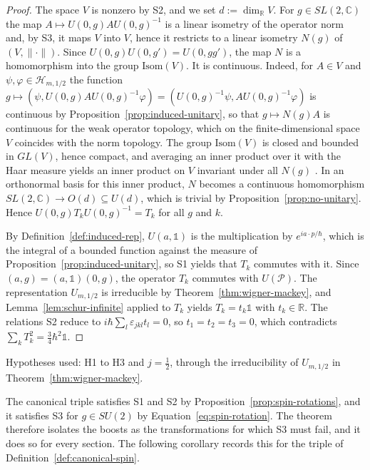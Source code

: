 \begin{proof}
	The space $V$ is nonzero by S2, and we set $d:=\dim_{\mathbb{R}}V$. For $g\in SL(2,\mathbb{C})$ the map $A\mapsto U(0,g)AU(0,g)^{-1}$ is a linear isometry of the operator norm and, by S3, it maps $V$ into $V$, hence it restricts to a linear isometry $N(g)$ of $(V,\|\cdot\|)$. Since $U(0,g)U(0,g')=U(0,gg')$, the map $N$ is a homomorphism into the group $\mathrm{Isom}(V)$. It is continuous. Indeed, for $A\in V$ and $\psi,\varphi\in\mathcal{H}_{m,1/2}$ the function $g\mapsto(\psi,U(0,g)AU(0,g)^{-1}\varphi)=(U(0,g)^{-1}\psi,AU(0,g)^{-1}\varphi)$ is continuous by Proposition~\ref{prop:induced-unitary}, so that $g\mapsto N(g)A$ is continuous for the weak operator topology, which on the finite-dimensional space $V$ coincides with the norm topology. The group $\mathrm{Isom}(V)$ is closed and bounded in $GL(V)$, hence compact, and averaging an inner product over it with the Haar measure yields an inner product on $V$ invariant under all $N(g)$ \cite[TODO-location]{TODO-Hal03}. In an orthonormal basis for this inner product, $N$ becomes a continuous homomorphism $SL(2,\mathbb{C})\to O(d)\subseteq U(d)$, which is trivial by Proposition~\ref{prop:no-unitary}. Hence $U(0,g)T_kU(0,g)^{-1}=T_k$ for all $g$ and $k$.
	
	By Definition~\ref{def:induced-rep}, $U(a,\mathbb{1})$ is the multiplication by $e^{ia\cdot p/\hbar}$, which is the integral of a bounded function against the measure of Proposition~\ref{prop:induced-unitary}, so S1 yields that $T_k$ commutes with it. Since $(a,g)=(a,\mathbb{1})(0,g)$, the operator $T_k$ commutes with $U(\mathcal{P})$. The representation $U_{m,1/2}$ is irreducible by Theorem~\ref{thm:wigner-mackey}, and Lemma~\ref{lem:schur-infinite} applied to $T_k$ yields $T_k=t_k\mathbb{1}$ with $t_k\in\mathbb{R}$. The relations S2 reduce to $i\hbar\sum_l\varepsilon_{jkl}t_l=0$, so $t_1=t_2=t_3=0$, which contradicts $\sum_kT_k^2=\frac34\hbar^2\mathbb{1}$.
\end{proof}

\noindent Hypotheses used: H1 to H3 and $j=\frac12$, through the irreducibility of $U_{m,1/2}$ in Theorem~\ref{thm:wigner-mackey}.

The canonical triple satisfies S1 and S2 by Proposition~\ref{prop:spin-rotations}, and it satisfies S3 for $g\in SU(2)$ by Equation~\eqref{eq:spin-rotation}. The theorem therefore isolates the boosts as the transformations for which S3 must fail, and it does so for every section. The following corollary records this for the triple of Definition~\ref{def:canonical-spin}.

